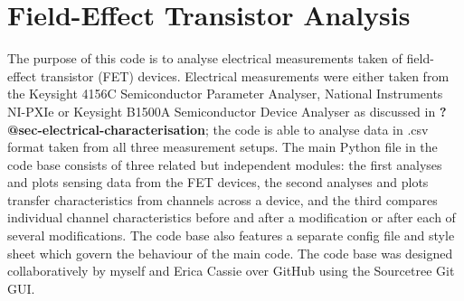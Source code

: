 \documentclass[
  a4paper,
]{scrbook}
\begin{document}
\hypertarget{sec-field-effect-transistor-analysis}{%
\section{Field-Effect Transistor
Analysis}\label{sec-field-effect-transistor-analysis}}

The purpose of this code is to analyse electrical measurements taken of
field-effect transistor (FET) devices. Electrical measurements were
either taken from the Keysight 4156C Semiconductor Parameter Analyser,
National Instruments NI-PXIe or Keysight B1500A Semiconductor Device
Analyser as discussed in \textbf{?@sec-electrical-characterisation}; the
code is able to analyse data in .csv format taken from all three
measurement setups. The main Python file in the code base consists of
three related but independent modules: the first analyses and plots
sensing data from the FET devices, the second analyses and plots
transfer characteristics from channels across a device, and the third
compares individual channel characteristics before and after a
modification or after each of several modifications. The code base also
features a separate config file and style sheet which govern the
behaviour of the main code. The code base was designed collaboratively
by myself and Erica Cassie over GitHub using the Sourcetree Git GUI.


\backmatter
\printbibliography[title=References]
\end{document}
